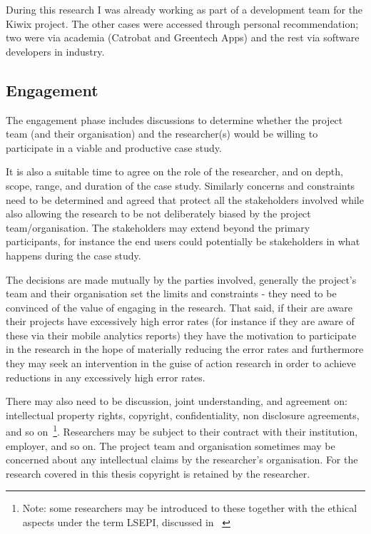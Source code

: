 During this research I was already working as part of a development team for the Kiwix project. The other cases were accessed through personal recommendation; two were via academia (Catrobat and Greentech Apps) and the rest via software developers in industry.

\subsection{Engagement}
The engagement phase includes discussions to determine whether the project team (and their organisation) and the researcher(s) would be willing to participate in a viable and productive case study. 

It is also a suitable time to agree on the role of the researcher, and on depth, scope, range, and duration of the case study. Similarly concerns and constraints need to be determined and agreed that protect all the stakeholders involved while also allowing the research to be not deliberately biased by the project team/organisation. The stakeholders may extend beyond the primary participants, for instance the end users could potentially be stakeholders in what happens during the case study.

The decisions are made mutually by the parties involved, generally the project's team and their organisation set the limits and constraints - they need to be convinced of the value of engaging in the research. That said, if their are aware their projects have excessively high error rates (for instance if they are aware of these via their mobile analytics reports) they have the motivation to participate in the research in the hope of materially reducing the error rates and furthermore they may seek an intervention in the guise of action research in order to achieve reductions in any excessively high error rates.

There may also need to be discussion, joint understanding, and agreement on: intellectual property rights, copyright, confidentiality, non disclosure agreements, and so on~\footnote{Note: some researchers may be introduced to these together with the ethical aspects under the term LSEPI, discussed in ~\citet{brooke2018__becoming_professional_a_university_perspective}}. Researchers may be subject to their contract with their institution, employer, and so on. The project team and organisation sometimes may be concerned about any intellectual claims by the researcher's organisation. For the research covered in this thesis copyright is retained by the researcher.

